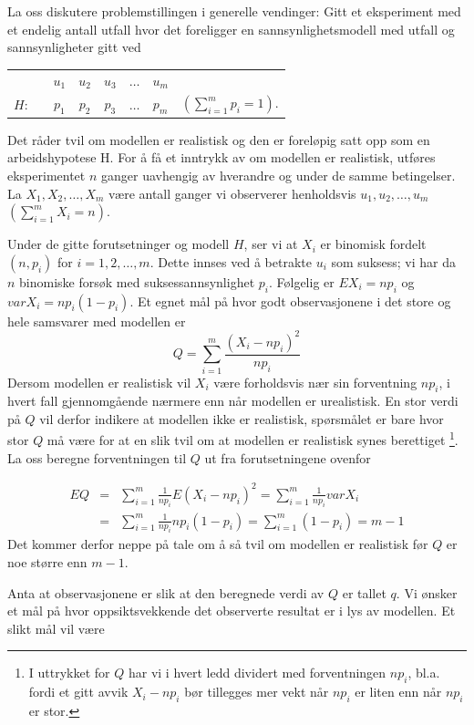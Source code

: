 La oss diskutere problemstillingen i generelle vendinger:
Gitt et eksperiment med et endelig antall utfall hvor det
foreligger en sannsynlighetsmodell med utfall og sannsynligheter
gitt ved
\begin{center}
\begin{tabular}{cccccccc}
   & & $u_1$ & $u_2$ & $u_3$ & $\ldots $ & $u_m$ & \\
 $H$: & & $p_1$ & $p_2$ & $p_3$ & $\ldots $ & $p_m$ & $(\sum_{i=1}^m p_i=1)$. 
\end{tabular}
\end{center}
Det råder tvil om modellen er realistisk og den er foreløpig satt
opp som en arbeidshypotese H. For å få et inntrykk av om modellen
er realistisk, utføres eksperimentet $n$ ganger uavhengig av
hverandre og under de samme betingelser. La $X_1, X_2, \ldots, X_m$
være antall ganger vi observerer henholdsvis $u_1, u_2, \ldots , u_m$
 $(\sum_{i=1}^m X_i=n)$.

Under de gitte forutsetninger og modell $H$, ser vi at $X_i$ er
binomisk fordelt $(n,p_i)$ for $i=1, 2, \ldots , m$.  Dette innses ved å betrakte
$u_i$ som suksess; vi har da $n$ binomiske forsøk med
suksessannsynlighet $p_i$. Følgelig er $EX_i=np_i$ og $varX_i=np_i(1-p_i)$.
Et egnet mål på hvor godt observasjonene i det store og hele
samsvarer med modellen er
\[ Q=\sum_{i=1}^{m}\frac{{(X_i-np_i)}^2}{np_i} \]
Dersom modellen er realistisk vil $X_i$ være forholdsvis nær sin
forventning $np_i$, i hvert fall gjennomgående nærmere enn når
modellen er urealistisk. En stor verdi på $Q$ vil derfor indikere
at modellen ikke er realistisk, spørsmålet er bare hvor stor $Q$
må være for at en slik tvil om at modellen er realistisk synes
berettiget
\footnote{I uttrykket for $Q$ har vi i hvert ledd
dividert med forventningen $np_i$, bl.a. fordi et gitt avvik
$X_i-np_i$ bør tillegges mer vekt når $np_i$ er liten enn når
$np_i$ er stor.}.
 La oss beregne forventningen til $Q$ ut fra
forutsetningene ovenfor

\begin{eqnarray*}
 EQ&=&\sum_{i=1}^{m}\frac{1}{np_i}E{(X_i-np_i)}^2=
                           \sum_{i=1}^{m}\frac{1}{np_i}varX_i \\
   &=&\sum_{i=1}^{m}\frac{1}{np_i}np_i(1-p_i)=\sum_{i=1}^{m}(1-p_i)=m-1
\end{eqnarray*}
Det kommer derfor neppe på tale om å så tvil om modellen er
realistisk før $Q$ er noe større enn $m-1$.

Anta at observasjonene er slik at den beregnede verdi av $Q$ er
tallet $q$. Vi ønsker et mål på hvor oppsiktsvekkende det
observerte resultat er i lys av modellen. Et slikt mål vil være

